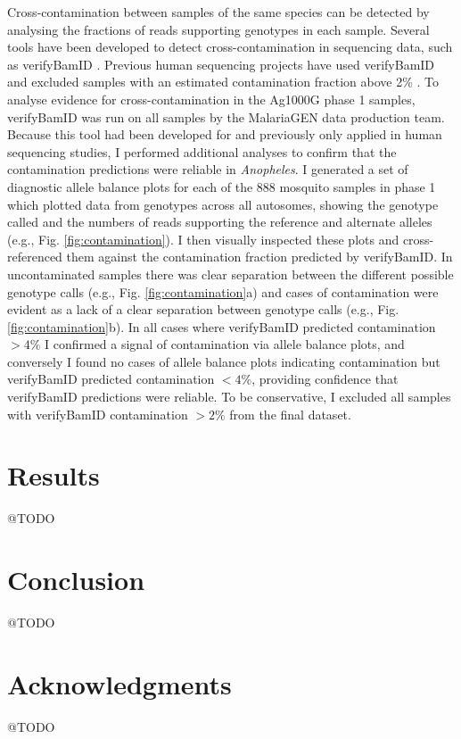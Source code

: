 \documentclass[a4paper,11pt,abstracton,hidelinks]{scrartcl}
\begin{document}
Cross-contamination between samples of the same species can be detected by analysing the fractions of reads supporting genotypes in each sample.
%
Several tools have been developed to detect cross-contamination in sequencing data, such as verifyBamID \citep{Jun2012}.
%
Previous human sequencing projects have used verifyBamID and excluded samples with an estimated contamination fraction above 2\% \citep{1000G2015}.
%
To analyse evidence for cross-contamination in the Ag1000G phase 1 samples, verifyBamID was run on all samples by the MalariaGEN data production team.
%
Because this tool had been developed for and previously only applied in human sequencing studies, I performed additional analyses to confirm that the contamination predictions were reliable in \textit{Anopheles}.
%
I generated a set of diagnostic allele balance plots for each of the 888 mosquito samples in phase 1 which plotted data from genotypes across all autosomes, showing the genotype called and the numbers of reads supporting the reference and alternate alleles (e.g., Fig. \ref{fig:contamination}). 
%
I then visually inspected these plots and cross-referenced them against the contamination fraction predicted by verifyBamID.
%
In uncontaminated samples there was clear separation between the different possible genotype calls (e.g., Fig. \ref{fig:contamination}a) and cases of contamination were evident as a lack of a clear separation between genotype calls (e.g., Fig. \ref{fig:contamination}b).
%
In all cases where verifyBamID predicted contamination $>4\%$ I confirmed a signal of contamination via allele balance plots, and conversely I found no cases of allele balance plots indicating contamination but verifyBamID predicted contamination $<4\%$, providing confidence that verifyBamID predictions were reliable. 
%
To be conservative, I excluded all samples with verifyBamID contamination $>2\%$ from the final dataset.
%


\section{Results}


@TODO


\section{Conclusion}


@TODO


\section{Acknowledgments}


@TODO


\printbibliography
\end{document}
